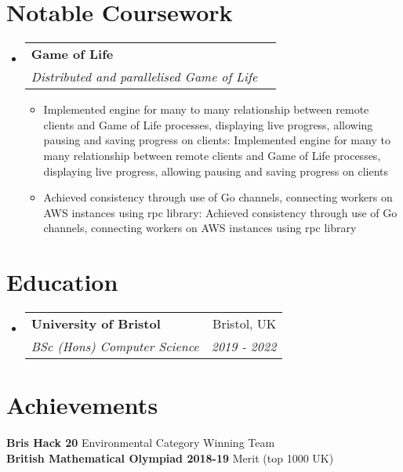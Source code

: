 \documentclass[a4paper,11pt]{article}
\makeatletter
\def \ifempty#1{\def\temp{#1} \ifx\temp\empty }
\newcommand{\resumeItem}[2]{
  \item\small{
  	\ifempty{#1}#2\else\textbf{#1}{: #2 \vspace{-2pt}}\fi
  }
}
\newcommand{\resumeSubheading}[4]{
  \vspace{-1pt}\item
    \begin{tabular*}{0.97\textwidth}{l@{\extracolsep{\fill}}r}
      \textbf{#1} & #2 \\
      \textit{\small#3} & \textit{\small #4} \\
    \end{tabular*}\vspace{-5pt}
}
\newcommand{\resumeSubHeadingListStart}{\begin{itemize}[leftmargin=*]}
\newcommand{\resumeSubHeadingListEnd}{\end{itemize}}
\newcommand{\resumeItemListStart}{\begin{itemize}}
\newcommand{\resumeItemListEnd}{\end{itemize}\vspace{-5pt}}
\makeatother
\begin{document}
\section{Notable Coursework}
  \resumeSubHeadingListStart
    \resumeSubheading
      {Game of Life}{}
      {Distributed and parallelised Game of Life}{}
      \resumeItemListStart
        \resumeItem{}
          {Implemented engine for many to many relationship between remote clients and Game of Life processes, displaying live progress, allowing pausing and saving progress on clients}
        \resumeItem{}
          {Achieved consistency through use of Go channels, connecting workers on AWS instances using rpc library}
      \resumeItemListEnd
  \resumeSubHeadingListEnd


\section{Education}
  \resumeSubHeadingListStart
    \resumeSubheading
      {University of Bristol}{Bristol, UK}
      {BSc (Hons) Computer Science}{2019 - 2022}
  \resumeSubHeadingListEnd


\section{Achievements}
  \textbf{Bris Hack 20}{ Environmental Category Winning Team} \\
  \textbf{British Mathematical Olympiad 2018-19}{ Merit (top 1000 UK)} \\
  
  
\end{document}
